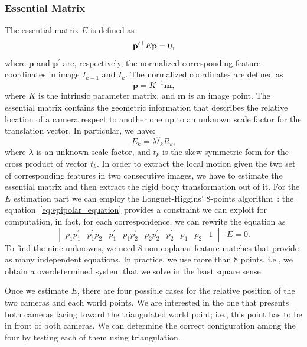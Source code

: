 \subsubsection{Essential Matrix}
\label{subsec:essential_matrix}
The essential matrix $E$ is defined as
%
\begin{equation}
\label{eq:epipolar_equation}
	\mathbf{p}^{\prime\top} E \mathbf{p} = 0 \text{,}
\end{equation}
%
\noindent where $\mathbf{p}$ and $\mathbf{p}^\prime$ are, respectively, the normalized corresponding 
feature coordinates in image $I_{k-1}$ and $I_{k}$. The normalized coordinates are defined as
%
\begin{equation}
	\mathbf{p} = K^{-1} \mathbf{m} \text{,}
\end{equation}
%
\noindent where $K$ is the intrinsic parameter matrix, and $\mathbf{m}$ is an
image point.
The essential matrix contains the geometric information that describes the 
relative location of a camera respect to another one up to an unknown scale factor 
for the translation vector. In particular, we have:
\begin{equation*}
	E_k = \lambda \hat{t}_kR_k \text{,}
\end{equation*}
\noindent where $\lambda$ is an unknown scale factor, and $\hat{t}_k$ is 
the skew-symmetric form for the cross product of vector $t_k$.
In order to extract the local motion given the two set of corresponding features
in two consecutive images, we have to estimate the essential matrix and then 
extract the rigid body transformation out of it.
For the $E$ estimation part we can employ the Longuet-Higgins' 8-points 
algorithm~\cite{longuet1981computer}: the equation~\ref{eq:epipolar_equation} 
provides a constraint we
can exploit for computation, in fact, for each correspondence, we can rewrite 
the equation as
%
\begin{equation*}
	\begin{bmatrix}
		p_1p^\prime_1 & 
        p^\prime_1p_2 & 
        p^\prime_1 & 
        p_1p^\prime_2 & 
        p_2p^\prime_2 & 
        p^\prime_2 & 
        p_1 & p_2 & 
        1
	\end{bmatrix} 
    \cdot
	E = 0	\text{.}
\end{equation*}
%
To find the nine unknowns, we need 8 non-coplanar feature matches that provide as many 
independent equations. In practice, we use more than 8 points, i.e., we obtain a overdetermined 
system that we solve in the least square sense.

Once we estimate $E$, there are four possible cases for the relative 
position of the two cameras and each world points. We are interested in the one
that presents both cameras facing toward the triangulated world point; i.e., this point has to be in front of both cameras. We can determine the correct configuration among the four by testing each of them using triangulation.

